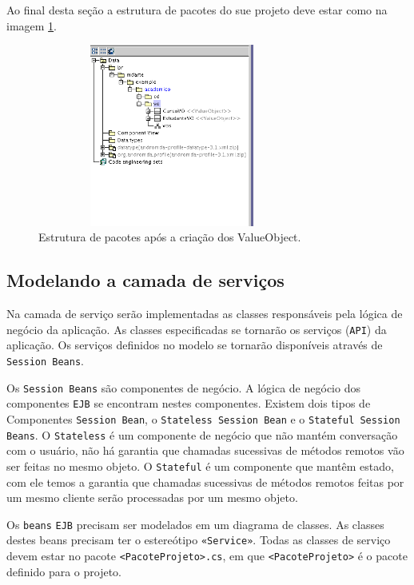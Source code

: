 Ao final desta seção a estrutura de pacotes do sue projeto deve estar como na
imagem \ref{pacotes_value_object}.
\begin{figure}[H]
	\centering
	\includegraphics[width=250pt,height=170pt]{imgs/tutorial-mdarte-0024.png}
	\caption{Estrutura de pacotes após a criação dos ValueObject.}
	\label{pacotes_value_object}
\end{figure}

\subsection{Modelando a camada de serviços}

Na camada de serviço serão implementadas as classes responsáveis pela lógica de
negócio da aplicação. As classes especificadas se tornarão os serviços
(\texttt{API}) da aplicação. Os serviços definidos no modelo se tornarão
disponíveis através de \texttt{Session Beans}.

Os \texttt{Session Beans} são componentes de negócio. A lógica de negócio dos
componentes \texttt{EJB} se encontram nestes componentes. Existem dois tipos de
Componentes \texttt{Session Bean}, o \texttt{Stateless Session Bean} e o
\texttt{Stateful Session Beans}. O \texttt{Stateless} é um componente de negócio
que não mantém conversação com o usuário, não há garantia que chamadas
sucessivas de métodos remotos vão ser feitas no mesmo objeto. O
\texttt{Stateful} é um componente que mantêm estado, com ele temos a garantia
que chamadas sucessivas de métodos remotos feitas por um mesmo cliente serão
processadas por um mesmo objeto.

Os \texttt{beans} \texttt{EJB} precisam ser modelados em um diagrama de classes.
As classes destes beans precisam ter o estereótipo \texttt{«Service»}. Todas as
classes de serviço devem estar no pacote \texttt{<PacoteProjeto>.cs}, em que
\texttt{<PacoteProjeto>} é o pacote definido para o projeto.

